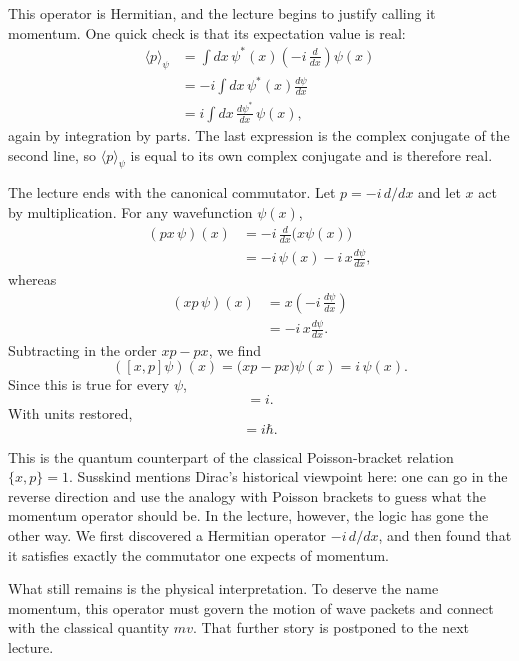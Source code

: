 This operator is Hermitian, and the lecture begins to justify calling it momentum. One quick check is that its expectation value is real:
\begin{align}
\langle p\rangle_\psi
&=\int dx\,\psi^*(x)\left(-i\,\frac{d}{dx}\right)\psi(x) \\
&=-i\int dx\,\psi^*(x)\frac{d\psi}{dx} \\
&=i\int dx\,\frac{d\psi^*}{dx}\,\psi(x),
\end{align}
again by integration by parts. The last expression is the complex conjugate of the second line, so \(\langle p\rangle_\psi\) is equal to its own complex conjugate and is therefore real.

The lecture ends with the canonical commutator. Let \(p=-i\,d/dx\) and let \(x\) act by multiplication. For any wavefunction \(\psi(x)\),
\begin{align}
(px\,\psi)(x)
&=-i\,\frac{d}{dx}\bigl(x\psi(x)\bigr) \\
&=-i\,\psi(x)-i\,x\frac{d\psi}{dx},
\end{align}
whereas
\begin{align}
(xp\,\psi)(x)
&=x\left(-i\,\frac{d\psi}{dx}\right) \\
&=-i\,x\frac{d\psi}{dx}.
\end{align}
Subtracting in the order \(xp-px\), we find
\begin{equation}
([x,p]\psi)(x)=\bigl(xp-px\bigr)\psi(x)=i\,\psi(x).
\end{equation}
Since this is true for every \(\psi\),
\begin{equation}
[x,p]=i.
\end{equation}
With units restored,
\begin{equation}
[x,p]=i\hbar.
\end{equation}

This is the quantum counterpart of the classical Poisson-bracket relation \(\{x,p\}=1\). Susskind mentions Dirac's historical viewpoint here: one can go in the reverse direction and use the analogy with Poisson brackets to guess what the momentum operator should be. In the lecture, however, the logic has gone the other way. We first discovered a Hermitian operator \(-i\,d/dx\), and then found that it satisfies exactly the commutator one expects of momentum.

What still remains is the physical interpretation. To deserve the name momentum, this operator must govern the motion of wave packets and connect with the classical quantity \(mv\). That further story is postponed to the next lecture.

